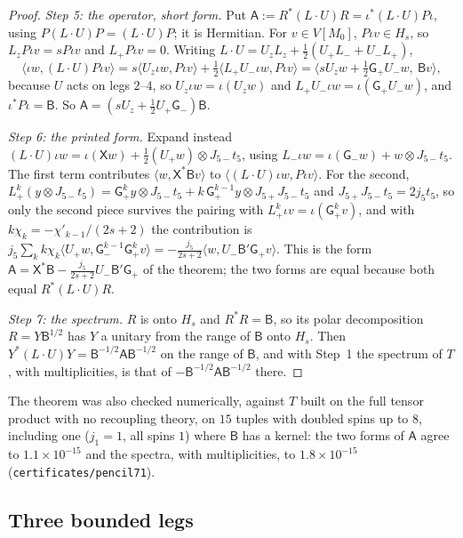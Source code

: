 \begin{proof}
\emph{Step 5: the operator, short form.} Put $\mathsf A:=R^*(L\cdot U)R=\iota^*(L\cdot U)P\iota$,
using $P(L\cdot U)P=(L\cdot U)P$; it is Hermitian. For $v\in V[M_0]$, $P\iota v\in H_s$,
so $L_zP\iota v=sP\iota v$ and $L_+P\iota v=0$. Writing
$L\cdot U=U_zL_z+\frac12(U_+L_-+U_-L_+)$,
\[
  \langle\iota w,(L\cdot U)P\iota v\rangle=s\langle U_z\iota w,P\iota v\rangle
  +\tfrac12\langle L_+U_-\iota w,P\iota v\rangle
  =\bigl\langle sU_zw+\tfrac12\mathsf G_+U_-w,\ \mathsf Bv\bigr\rangle,
\]
because $U$ acts on legs $2$--$4$, so $U_z\iota w=\iota(U_zw)$ and
$L_+U_-\iota w=\iota(\mathsf G_+U_-w)$, and $\iota^*P\iota=\mathsf B$. So
$\mathsf A=(sU_z+\frac12U_+\mathsf G_-)\mathsf B$.

\emph{Step 6: the printed form.} Expand instead
$(L\cdot U)\iota w=\iota(\mathsf Xw)+\frac12(U_+w)\otimes J_{5-}t_5$, using
$L_-\iota w=\iota(\mathsf G_-w)+w\otimes J_{5-}t_5$. The first term contributes
$\langle w,\mathsf X^*\mathsf Bv\rangle$ to $\langle(L\cdot U)\iota w,P\iota v\rangle$. For the
second, $L_+^k(y\otimes J_{5-}t_5)=\mathsf G_+^ky\otimes J_{5-}t_5+k\,\mathsf G_+^{k-1}y\otimes
J_{5+}J_{5-}t_5$ and $J_{5+}J_{5-}t_5=2j_5t_5$, so only the second piece survives the
pairing with $L_+^k\iota v=\iota(\mathsf G_+^kv)$, and with $k\chi_k=-\chi'_{k-1}/(2s+2)$
the contribution is
$j_5\sum_kk\chi_k\langle U_+w,\mathsf G_-^{k-1}\mathsf G_+^kv\rangle
=-\frac{j_5}{2s+2}\langle w,U_-\mathsf B'\mathsf G_+v\rangle$. This is the form
$\mathsf A=\mathsf X^*\mathsf B-\frac{j_5}{2s+2}U_-\mathsf B'\mathsf G_+$ of the theorem;
the two forms are equal because both equal $R^*(L\cdot U)R$.

\emph{Step 7: the spectrum.} $R$ is onto $H_s$ and $R^*R=\mathsf B$, so its polar
decomposition $R=Y\mathsf B^{1/2}$ has $Y$ a unitary from the range of $\mathsf B$ onto
$H_s$. Then $Y^*(L\cdot U)Y=\mathsf B^{-1/2}\mathsf A\mathsf B^{-1/2}$ on the range of
$\mathsf B$, and with Step~1 the spectrum of $T$, with multiplicities, is that of
$-\mathsf B^{-1/2}\mathsf A\mathsf B^{-1/2}$ there.
\end{proof}

The theorem was also checked numerically, against $T$ built on the full tensor product
with no recoupling theory, on $15$ tuples with doubled spins up to $8$, including one
($j_1=1$, all spins $1$) where $\mathsf B$ has a kernel: the two forms of $\mathsf A$
agree to $1.1\times10^{-15}$ and the spectra, with multiplicities, to $1.8\times10^{-15}$
(\texttt{certificates/pencil71}).

\subsection*{Three bounded legs}


